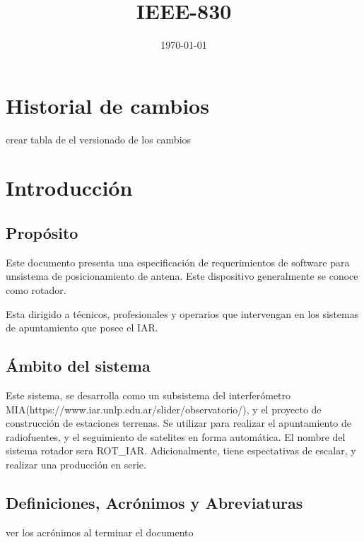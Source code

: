 \documentclass[12pt,a4paper, twosite]{article}
\date{\today}
\title{IEEE-830}
\begin{document}
	\begin{titlepage}
		\maketitle
		
	\end{titlepage}

\section*{Historial de cambios  }
crear tabla de el versionado de los cambios 

\newpage
	\tableofcontents	
\newpage
	\section{Introducción}
	\label{sec:org60390fa}



	
	\subsection{Propósito}
	\label{sec:org434c3ef}
	Este documento presenta una especificación de requerimientos de software para unsistema de  posicionamiento de antena. Este dispositivo generalmente se conoce como rotador. 
	 
	Esta dirigido a técnicos, profesionales y operarios que intervengan en los sistemas de apuntamiento que posee el IAR.   

	
	
	\subsection{Ámbito del sistema}
	\label{sec:org12e44a1}
	Este sistema, se desarrolla como un subsistema del interferómetro MIA(https://www.iar.unlp.edu.ar/slider/observatorio/), y el proyecto de construcción de estaciones terrenas. Se utilizar para realizar el apuntamiento de radiofuentes, y el seguimiento de satelites en forma automática.  El nombre del sistema rotador sera ROT\_IAR. Adicionalmente, tiene espectativas de escalar, y realizar una producción en serie. 
	
	
	\subsection{Definiciones, Acrónimos y Abreviaturas}
	\label{sec:orgb158e36}
	
	ver los acrónimos al terminar el documento 
	
\end{document}
